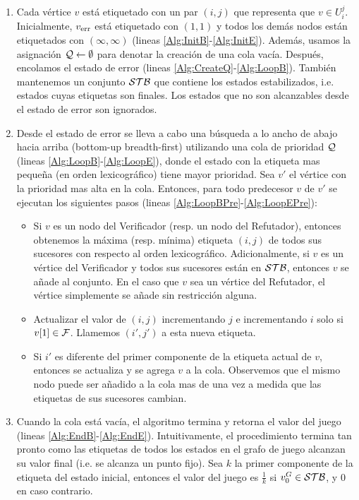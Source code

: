 \begin{enumerate}
  \item Cada vértice $v$ está etiquetado con un par $(i, j)$ que representa que $v \in U_{i}^{j}$. Inicialmente, $\ErrorSt$ está etiquetado con $(1, 1)$ y todos los demás nodos están etiquetados con $(\infty, \infty)$ (lineas \ref{Alg:InitB}-\ref{Alg:InitE}). 
  Además, usamos la asignación $\Q \gets \emptyset$ para denotar la creación de una cola vacía. 
  Después, encolamos el estado de error (lineas \ref{Alg:CreateQ}-\ref{Alg:LoopB}). También mantenemos un conjunto $\STB$ que contiene los estados estabilizados, i.e. estados cuyas etiquetas son finales. Los estados que no son alcanzables desde el estado de error son ignorados.
  \item Desde el estado de error se lleva a cabo una búsqueda a lo ancho de abajo hacia arriba (bottom-up breadth-first) utilizando una cola de prioridad $\Q$ (lineas \ref{Alg:LoopB}-\ref{Alg:LoopE}), donde el estado con la etiqueta mas pequeña (en orden lexicográfico) tiene mayor prioridad. 
  Sea $v'$ el vértice con la prioridad mas alta en la cola. Entonces, para todo predecesor $v$ de $v'$ se ejecutan los siguientes pasos (lineas \ref{Alg:LoopBPre}-\ref{Alg:LoopEPre}):
  \begin{itemize}
    \item Si $v$ es un nodo del Verificador (resp. un nodo del Refutador), entonces obtenemos la máxima (resp. mínima) etiqueta $(i,j)$ de todos sus sucesores con respecto al orden lexicográfico. Adicionalmente, si $v$ es un vértice del Verificador y todos sus sucesores están en $\STB$, entonces $v$ se añade al conjunto. En el caso que $v$ sea un vértice del Refutador, 
    el vértice simplemente se añade sin restricción alguna. 
    \item Actualizar el valor de $(i,j)$ incrementando $j$ e incrementando $i$ solo si $\pr{1}{v} \in \Faults$. Llamemos $(i',j')$ a esta nueva etiqueta.
    \item Si $i'$ es diferente del primer componente de la etiqueta actual de $v$, entonces se actualiza y se agrega $v$ a la cola. 
    Observemos que el mismo nodo puede ser añadido a la cola mas de una vez a medida que las etiquetas de sus sucesores cambian.
  \end{itemize}
  \item Cuando la cola está vacía, 
  el algoritmo termina y retorna el valor del juego (lineas \ref{Alg:EndB}-\ref{Alg:EndE}). 
  Intuitivamente, el procedimiento termina tan pronto como las etiquetas de todos los estados en el grafo de juego alcanzan su valor final (i.e. se alcanza un punto fijo). 
  Sea $k$ la primer componente de la etiqueta del estado inicial, entonces el valor del juego es $\frac{1}{k}$ si 
  $\InitVertex^G \in \STB$, y $0$ en caso contrario.\\
\end{enumerate}
